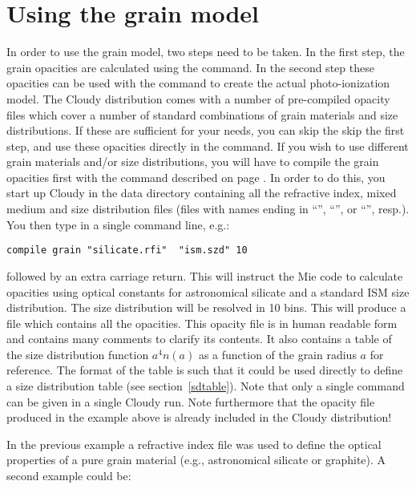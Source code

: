 \section{Using the grain model}
\label{grain:compile}
In order to use the grain model, two steps need to be taken. In the first
step, the grain opacities are calculated using the 
command. In the second step these opacities can be used with the
 command to create the actual photo-ionization model. The
Cloudy distribution comes with a number of pre-compiled opacity files which
cover a number of standard combinations of grain materials and size
distributions. If these are sufficient for your needs, you can skip the skip
the first step, and use these opacities directly in the 
command. If you wish to use different grain materials and/or size
distributions, you will have to compile the grain opacities first with the
 command described on page \pageref{sec:CompileGrains}. In
order to do this, you start up Cloudy in the data directory containing all the
refractive index, mixed medium and size distribution files (files with names
ending in ``'', ``'', or
``'', resp.). You then type in a single command line, e.g.:

\begin{verbatim}
compile grain "silicate.rfi"  "ism.szd" 10
\end{verbatim}

\noindent followed by an extra carriage return. This will instruct the Mie
code to calculate opacities using optical constants for astronomical silicate
and a \citet{Mathis1977} standard ISM size distribution. The size
distribution will be resolved in 10 bins. This will produce a file
 which contains all the opacities. This
opacity file is in human readable form and contains many comments to clarify
its contents. It also contains a table of the size distribution function $a^4
n(a)$ as a function of the grain radius $a$ for reference. The format of the
table is such that it could be used directly to define a size distribution
table (see section~\ref{sdtable}). Note that only a single  command can be given in a single Cloudy run. Note furthermore that
the opacity file produced in the example above is already included in the
Cloudy distribution!

In the previous example a refractive index file was used to define the optical
properties of a pure grain material (e.g., astronomical silicate or graphite).
A second example could be:

